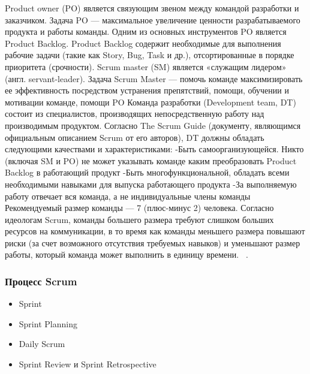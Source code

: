 \documentclass{../industrial-development}
\begin{document}
\lecturenotes
Product owner (PO) является связующим звеном между командой разработки и заказчиком. Задача PO — максимальное увеличение ценности разрабатываемого продукта 
и работы команды. Одним из основных инструментов PO является Product Backlog. Product Backlog содержит необходимые для выполнения рабочие задачи (такие как Story, Bug, Task и др.), отсортированные в порядке приоритета (срочности). Scrum master (SM) является «служащим лидером» (англ. servant-leader). Задача Scrum Master — помочь команде максимизировать ее эффективность посредством устранения препятствий, помощи, обучении и мотивации команде, помощи PO Команда разработки (Development team, DT) состоит из специалистов, производящих непосредственную работу над производимым продуктом. Согласно The Scrum Guide (документу, являющимся официальным описанием Scrum от его авторов), DT должны обладать следующими качествами и характеристиками: -Быть самоорганизующейся. Никто (включая SM и PO) не может указывать команде каким преобразовать Product Backlog в работающий продукт -Быть многофункциональной, обладать всеми необходимыми навыками для выпуска работающего продукта -За выполняемую работу отвечает вся команда, а не индивидуальные члены команды 
Рекомендуемый размер команды — 7 (плюс-минус 2) человека. Согласно идеологам Scrum, команды большего размера требуют слишком больших ресурсов на коммуникации, в то время как команды меньшего размера повышают риски (за счет возможного отсутствия требуемых навыков) и уменьшают размер работы, который команда может выполнить в единицу времени. 
~\cite{Fowler}.


\begin{frame} \frametitle{Процесс Scrum}
\begin{itemize}
	\item Sprint
	\item Sprint Planning
	\item Daily Scrum
	\item Sprint Review и Sprint Retrospective
	\end{itemize}	
\end{frame}
\end{document}
